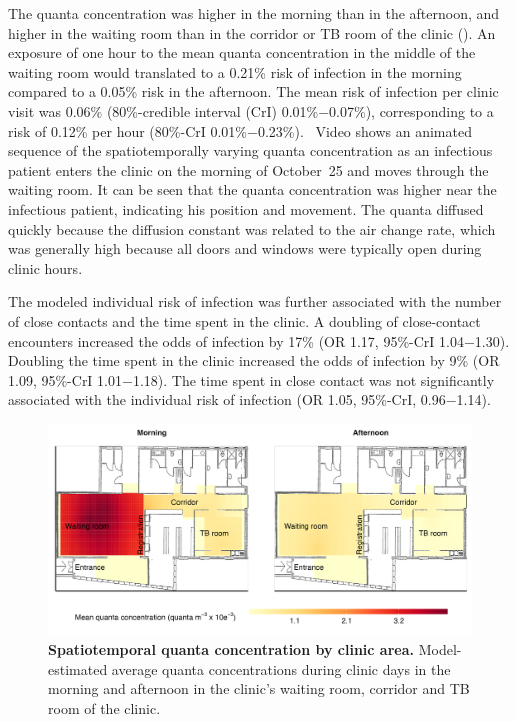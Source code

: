 \documentclass[fleqn,11pt]{wlscirep}
\begin{document}
The quanta concentration was higher in the morning than in the afternoon, and higher in the waiting room than in the corridor or TB room of the clinic (). An exposure of one hour to the mean quanta concentration in the middle of the waiting room would translated to a 0.21\% risk of infection in the morning compared to a 0.05\% risk in the afternoon. The mean risk of infection per clinic visit was 0.06\% (80\%-credible interval (CrI) 0.01\%$-$0.07\%), corresponding to a risk of 0.12\% per hour (80\%-CrI 0.01\%$-$0.23\%). \supp~Video shows an animated sequence of the spatiotemporally varying quanta concentration as an infectious patient enters the clinic on the morning of October~25 and moves through the waiting room. It can be seen that the quanta concentration was higher near the infectious patient, indicating his position and movement. The quanta diffused quickly because the diffusion constant was related to the air change rate, which was generally high because all doors and windows were typically open during clinic hours.

The modeled individual risk of infection was further associated with the number of close contacts and the time spent in the clinic. A doubling of close-contact encounters increased the odds of infection by 17\% (OR 1.17, 95\%-CrI 1.04$-$1.30). Doubling the time spent in the clinic increased the odds of infection by 9\% (OR 1.09, 95\%-CrI 1.01$-$1.18). The time spent in close contact was not significantly associated with the individual risk of infection (OR 1.05, 95\%-CrI, 0.96$-$1.14). 

\begin{figure}
    \centering
    \includegraphics{results/modeling/mean-quanta-concentration.png}
    \caption{\textbf{Spatiotemporal quanta concentration by clinic area.} Model-estimated average quanta concentrations during clinic days in the morning and afternoon in the clinic's waiting room, corridor and TB room of the clinic.}
    \label{fig:main-modeling-results}
\end{figure}
\end{document}
